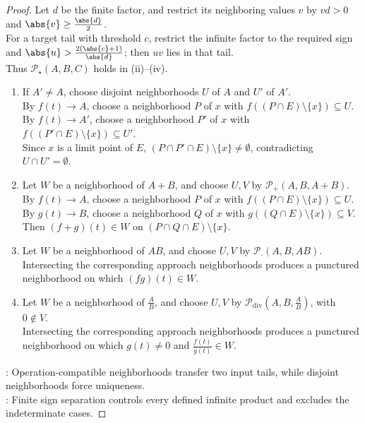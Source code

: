 \begin{theorem}
\begin{proof}
Let $d$ be the finite factor, and restrict its neighboring values $v$ by $vd>0$ and $\abs{v}\geq\frac{\abs{d}}{2}$.\\
For a target tail with threshold $c$, restrict the infinite factor to the required sign and $\abs{u}>\frac{2(\abs{c}+1)}{\abs{d}}$; then $uv$ lies in that tail.\\
Thus $\mathcal{P}_\star(A,B,C)$ holds in (ii)--(iv).
\begin{enumerate}[label=(\roman*)]
\setlength{\itemsep}{0pt}
\item If $A'\neq A$, choose disjoint neighborhoods $U$ of $A$ and $U'$ of $A'$.\\
By $f(t)\to A$, choose a neighborhood $P$ of $x$ with $f((P\cap E)\setminus\{x\})\subseteq U$.\\
By $f(t)\to A'$, choose a neighborhood $P'$ of $x$ with $f((P'\cap E)\setminus\{x\})\subseteq U'$.\\
Since $x$ is a limit point of $E$, $(P\cap P'\cap E)\setminus\{x\}\neq\emptyset$, contradicting $U\cap U'=\emptyset$.
\item Let $W$ be a neighborhood of $A+B$, and choose $U,V$ by $\mathcal{P}_+(A,B,A+B)$.\\
By $f(t)\to A$, choose a neighborhood $P$ of $x$ with $f((P\cap E)\setminus\{x\})\subseteq U$.\\
By $g(t)\to B$, choose a neighborhood $Q$ of $x$ with $g((Q\cap E)\setminus\{x\})\subseteq V$. Then $(f+g)(t)\in W$ on $(P\cap Q\cap E)\setminus\{x\}$.
\item Let $W$ be a neighborhood of $AB$, and choose $U,V$ by $\mathcal{P}_\cdot(A,B,AB)$.\\
Intersecting the corresponding approach neighborhoods produces a punctured neighborhood on which $(fg)(t)\in W$.
\item Let $W$ be a neighborhood of $\frac{A}{B}$, and choose $U,V$ by $\mathcal{P}_{\mathrm{div}}(A,B,\frac{A}{B})$, with $0\notin V$.\\
Intersecting the corresponding approach neighborhoods produces a punctured neighborhood on which $g(t)\neq0$ and $\frac{f(t)}{g(t)}\in W$.
\end{enumerate}
: Operation-compatible neighborhoods transfer two input tails, while disjoint neighborhoods force uniqueness.\\
: Finite sign separation controls every defined infinite product and excludes the indeterminate cases.
\end{proof}
\end{theorem}
